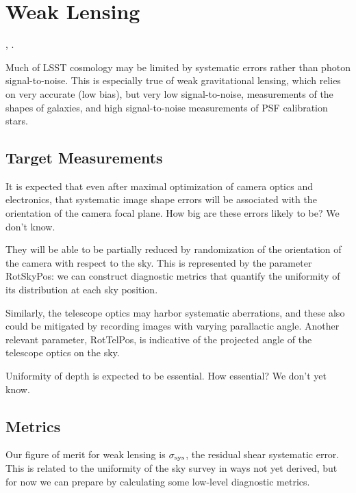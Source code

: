 %
%

\section{Weak Lensing}
\def\secname{wl}\label{sec:\secname}

,
.

Much of LSST cosmology may be limited by systematic errors rather than
photon signal-to-noise. This is especially true of weak gravitational
lensing,  which relies on very accurate (\ie low bias), but very low
signal-to-noise, measurements of the shapes of galaxies, and high
signal-to-noise measurements of PSF calibration stars.

\subsection{Target Measurements}

It is expected that even after maximal optimization of camera optics
and electronics, that systematic image shape errors will be associated
with the orientation of the camera focal plane.  How big are these
errors likely to be? We don't know.

They will be able to be  partially reduced by randomization of the
orientation of the camera with respect to the sky.  This is
represented by the parameter RotSkyPos: we can construct diagnostic
metrics that quantify the uniformity of its distribution at each sky
position.

Similarly, the telescope optics may harbor systematic aberrations, and
these also could be mitigated by recording images with varying
parallactic angle.  Another relevant parameter, RotTelPos, is
indicative of the projected angle of the telescope optics on the sky.

Uniformity of depth is expected to be essential. How essential? We don't yet know.


\subsection{Metrics}

Our figure of merit for weak lensing is $\sigma_{\rm sys}$, the
residual shear systematic error. This is related to the uniformity of
the sky survey in ways not yet derived, but for now we can prepare by
calculating some low-level diagnostic metrics.

